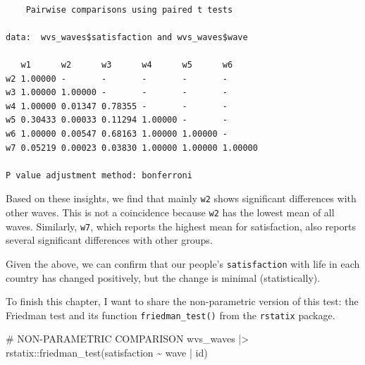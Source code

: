\documentclass[
  letterpaper,
]{krantz}
\makeatletter
\newenvironment{Shaded}{\begin{snugshade}}{\end{snugshade}}
\newcommand{\AttributeTok}[1]{\textcolor[rgb]{0.40,0.45,0.13}{#1}}
\newcommand{\CommentTok}[1]{\textcolor[rgb]{0.37,0.37,0.37}{#1}}
\newcommand{\ConstantTok}[1]{\textcolor[rgb]{0.56,0.35,0.01}{#1}}
\newcommand{\FunctionTok}[1]{\textcolor[rgb]{0.28,0.35,0.67}{#1}}
\newcommand{\NormalTok}[1]{\textcolor[rgb]{0.00,0.23,0.31}{#1}}
\newcommand{\SpecialCharTok}[1]{\textcolor[rgb]{0.37,0.37,0.37}{#1}}
\newcommand{\StringTok}[1]{\textcolor[rgb]{0.13,0.47,0.30}{#1}}
\newenvironment{kframe}{%
\medskip{}
\setlength{\fboxsep}{.8em}
 \def\at@end@of@kframe{}%
 \ifinner\ifhmode%
  \def\at@end@of@kframe{\end{minipage}}%
  \begin{minipage}{\columnwidth}%
 \fi\fi%
 \def\FrameCommand##1{\hskip\@totalleftmargin \hskip-\fboxsep
 \colorbox{shadecolor}{##1}\hskip-\fboxsep
     \hskip-\linewidth \hskip-\@totalleftmargin \hskip\columnwidth}%
 \MakeFramed {\advance\hsize-\width
   \@totalleftmargin\z@ \linewidth\hsize
   \@setminipage}}%
 {\par\unskip\endMakeFramed%
 \at@end@of@kframe}
\renewenvironment{Shaded}{\begin{kframe}}{\end{kframe}}
\makeatother
\begin{document}
\begin{Shaded}
\end{Shaded}

\begin{verbatim}

    Pairwise comparisons using paired t tests 

data:  wvs_waves$satisfaction and wvs_waves$wave 

   w1      w2      w3      w4      w5      w6     
w2 1.00000 -       -       -       -       -      
w3 1.00000 1.00000 -       -       -       -      
w4 1.00000 0.01347 0.78355 -       -       -      
w5 0.30433 0.00033 0.11294 1.00000 -       -      
w6 1.00000 0.00547 0.68163 1.00000 1.00000 -      
w7 0.05219 0.00023 0.03830 1.00000 1.00000 1.00000

P value adjustment method: bonferroni 
\end{verbatim}

Based on these insights, we find that mainly \texttt{w2} shows
significant differences with other waves. This is not a coincidence
because \texttt{w2} has the lowest mean of all waves. Similarly,
\texttt{w7}, which reports the highest mean for satisfaction, also
reports several significant differences with other groups.

Given the above, we can confirm that our people's \texttt{satisfaction}
with life in each country has changed positively, but the change is
minimal (statistically).

To finish this chapter, I want to share the non-parametric version of
this test: the Friedman test and its function \texttt{friedman\_test()}
from the \texttt{rstatix} package.

\begin{Shaded}
\begin{Highlighting}[]
\CommentTok{\# NON{-}PARAMETRIC COMPARISON}
\NormalTok{wvs\_waves }\SpecialCharTok{|\textgreater{}}\NormalTok{ rstatix}\SpecialCharTok{::}\FunctionTok{friedman\_test}\NormalTok{(satisfaction }\SpecialCharTok{\textasciitilde{}}\NormalTok{ wave }\SpecialCharTok{|}\NormalTok{ id)}
\end{Highlighting}
\end{Shaded}
\end{document}
